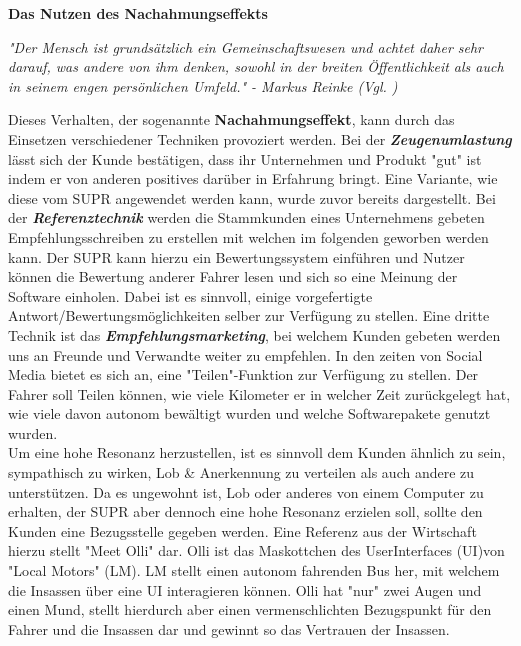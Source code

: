 \begin{large}
	\textbf{Das Nutzen des Nachahmungseffekts}\cite[S. 67fff.]{vkPsy}\label{nachahmungseffekt}
\end{large}
\begin{center}
	\textit{"Der Mensch ist grundsätzlich ein Gemeinschaftswesen und achtet daher sehr darauf, was andere von ihm denken, sowohl in der breiten Öffentlichkeit als auch in seinem engen persönlichen Umfeld." - Markus Reinke (Vgl. )\cite[S. 67]{vkPsy} }\\
\end{center}
Dieses Verhalten, der sogenannte \textbf{Nachahmungseffekt}, kann durch das Einsetzen verschiedener Techniken provoziert werden. Bei der \textbf{\textit{Zeugenumlastung}} lässt sich der Kunde bestätigen, dass ihr Unternehmen und Produkt "gut" ist indem er von anderen positives darüber in Erfahrung bringt. Eine Variante, wie diese vom SUPR angewendet werden kann, wurde zuvor bereits dargestellt. Bei der \textbf{\textit{Referenztechnik}} werden die Stammkunden eines Unternehmens gebeten Empfehlungsschreiben zu erstellen mit welchen im folgenden geworben werden kann. Der SUPR kann hierzu ein Bewertungssystem einführen und Nutzer können die Bewertung anderer Fahrer lesen und sich so eine Meinung der Software einholen. Dabei ist es sinnvoll, einige vorgefertigte Antwort/Bewertungsmöglichkeiten selber zur Verfügung zu stellen. Eine dritte Technik ist das \textbf{\textit{Empfehlungsmarketing}}, bei welchem Kunden gebeten werden uns an Freunde und Verwandte weiter zu empfehlen. In den zeiten von Social Media bietet es sich an, eine "Teilen"-Funktion zur Verfügung zu stellen. Der Fahrer soll Teilen können, wie viele Kilometer er in welcher Zeit zurückgelegt hat, wie viele davon autonom bewältigt wurden und welche Softwarepakete genutzt wurden.\\

Um eine hohe Resonanz herzustellen, ist es sinnvoll dem Kunden ähnlich zu sein, sympathisch zu wirken, Lob \& Anerkennung zu verteilen als auch andere zu unterstützen. Da es ungewohnt ist, Lob oder anderes von einem Computer zu erhalten, der SUPR aber dennoch eine hohe Resonanz erzielen soll, sollte den Kunden eine Bezugsstelle gegeben werden. Eine Referenz aus der Wirtschaft hierzu stellt "Meet Olli" dar\cite{meetolli}. Olli ist das Maskottchen des UserInterfaces (UI)von "Local Motors" (LM). LM stellt einen autonom fahrenden Bus her, mit welchem die Insassen über eine UI interagieren können. Olli hat "nur" zwei Augen und einen Mund, stellt hierdurch aber einen vermenschlichten Bezugspunkt für den Fahrer und die Insassen dar und gewinnt so das Vertrauen der Insassen. \\

